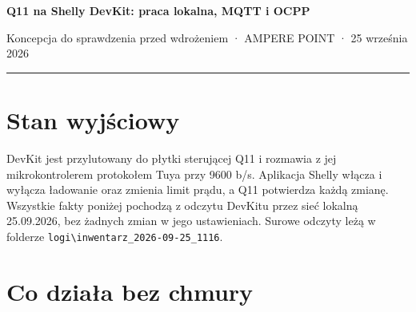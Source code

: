 \documentclass[11pt,a4paper]{article}
\begin{document}
{\LARGE\bfseries Q11 na Shelly DevKit: praca lokalna, MQTT i OCPP\par}
{\large Koncepcja do sprawdzenia przed wdrożeniem · AMPERE POINT · 25 września 2026\par}
\vspace{4pt}\textcolor{apteal}{\rule{\textwidth}{1.2pt}}

\section{Stan wyjściowy}

DevKit jest przylutowany do płytki sterującej Q11 i rozmawia z jej mikrokontrolerem protokołem Tuya przy 9600 b/s. Aplikacja Shelly włącza i wyłącza ładowanie oraz zmienia limit prądu, a Q11 potwierdza każdą zmianę. Wszystkie fakty poniżej pochodzą z odczytu DevKitu przez sieć lokalną 25.09.2026, bez żadnych zmian w jego ustawieniach. Surowe odczyty leżą w folderze \texttt{logi\textbackslash{}inwentarz\_\allowbreak{}2026-\allowbreak{}09-\allowbreak{}25\_\allowbreak{}1116}.


\section{Co działa bez chmury}
\end{document}
